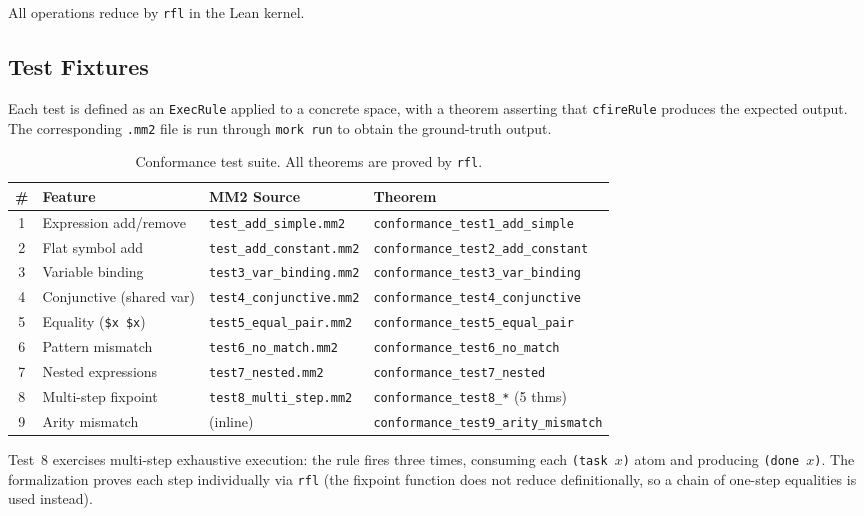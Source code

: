 \documentclass[11pt]{article}
\theoremstyle{definition}
\theoremstyle{remark}
\begin{document}
\noindent
All operations reduce by \texttt{rfl} in the Lean kernel.

\subsection{Test Fixtures}

Each test is defined as an \texttt{ExecRule} applied to a concrete space,
with a theorem asserting that \texttt{cfireRule} produces the expected
output.  The corresponding \texttt{.mm2} file is run through
\texttt{mork run} to obtain the ground-truth output.

\begin{table}[ht]
\centering
\caption{Conformance test suite.  All theorems are proved by \texttt{rfl}.}
\label{tab:conformance}
\begin{tabular}{@{}clll@{}}
\toprule
\textbf{\#} & \textbf{Feature} & \textbf{MM2 Source} & \textbf{Theorem} \\
\midrule
1 & Expression add/remove  & \texttt{test\_add\_simple.mm2} & \texttt{conformance\_test1\_add\_simple} \\
2 & Flat symbol add        & \texttt{test\_add\_constant.mm2} & \texttt{conformance\_test2\_add\_constant} \\
3 & Variable binding       & \texttt{test3\_var\_binding.mm2} & \texttt{conformance\_test3\_var\_binding} \\
4 & Conjunctive (shared var) & \texttt{test4\_conjunctive.mm2} & \texttt{conformance\_test4\_conjunctive} \\
5 & Equality (\texttt{\$x \$x})  & \texttt{test5\_equal\_pair.mm2} & \texttt{conformance\_test5\_equal\_pair} \\
6 & Pattern mismatch       & \texttt{test6\_no\_match.mm2} & \texttt{conformance\_test6\_no\_match} \\
7 & Nested expressions     & \texttt{test7\_nested.mm2} & \texttt{conformance\_test7\_nested} \\
8 & Multi-step fixpoint    & \texttt{test8\_multi\_step.mm2} & \texttt{conformance\_test8\_*} (5 thms) \\
9 & Arity mismatch         & (inline) & \texttt{conformance\_test9\_arity\_mismatch} \\
\bottomrule
\end{tabular}
\end{table}

\noindent
Test~8 exercises multi-step exhaustive execution: the rule fires three times,
consuming each \texttt{(task $x$)} atom and producing \texttt{(done $x$)}.
The formalization proves each step individually via \texttt{rfl} (the
fixpoint function does not reduce definitionally, so a chain of one-step
equalities is used instead).
\end{document}
